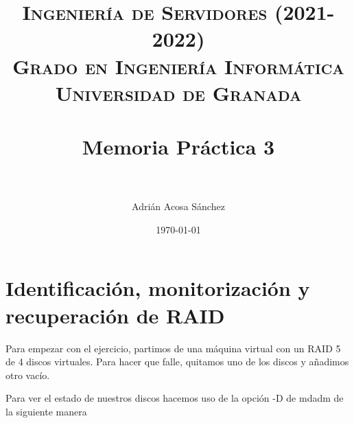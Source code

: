


\title{	
\normalfont \normalsize 
\textsc{\textbf{Ingeniería de Servidores (2021-2022)} \\ Grado en Ingeniería Informática \\ Universidad de Granada} \\ [25pt] %
\horrule{0.5pt} \\[0.4cm] %
\huge Memoria Práctica 3 \\ %
\horrule{2pt} \\[0.5cm] %
}

\author{Adrián Acosa Sánchez} %

\date{\normalsize\today} %




\maketitle %

\newpage %

\tableofcontents %
 
\newpage


\section{Identificación, monitorización y recuperación de RAID}

Para empezar con el ejercicio, partimos de una máquina virtual con un RAID 5 de 4 discos virtuales. Para hacer que falle, quitamos uno de los discos y añadimos otro vacío.

Para ver el estado de nuestros discos hacemos uso de la opción -D de mdadm de la siguiente manera

